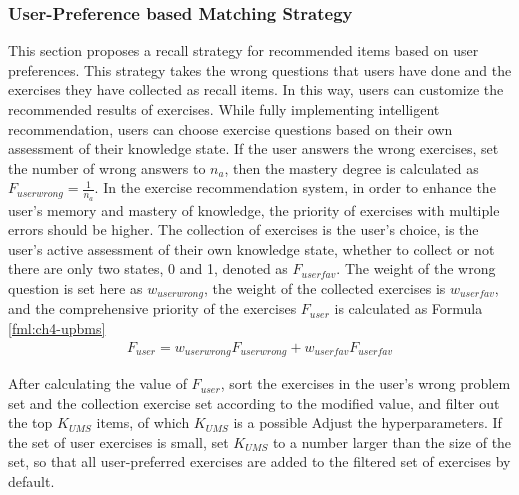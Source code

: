 \subsubsection{User-Preference based Matching Strategy}


This section proposes a recall strategy for recommended items based on user preferences. This strategy takes the wrong questions that users have done and the exercises they have collected as recall items. In this way, users can customize the recommended results of exercises. While fully implementing intelligent recommendation, users can choose exercise questions based on their own assessment of their knowledge state. If the user answers the wrong exercises, set the number of wrong answers to \(n_a\), then the mastery degree is calculated as \(F_{userwrong}=\frac{1}{n_a}\). In the exercise recommendation system, in order to enhance the user's memory and mastery of knowledge, the priority of exercises with multiple errors should be higher. The collection of exercises is the user's choice, is the user's active assessment of their own knowledge state, whether to collect or not there are only two states, 0 and 1, denoted as \(F_{userfav}\). The weight of the wrong question is set here as \(w_{userwrong}\), the weight of the collected exercises is \(w_{userfav}\), and the comprehensive priority of the exercises \(F_{user}\) is calculated as Formula \ref{fml:ch4-upbms}
\begin{align}
  F_{user} = w_{userwrong}F_{userwrong} + w_{userfav}F_{userfav} \label{fml:ch4-upbms}
\end{align}

After calculating the value of \(F_{user}\), sort the exercises in the user's wrong problem set and the collection exercise set according to the modified value, and filter out the top \(K_{UMS}\) items, of which \(K_{UMS}\) is a possible Adjust the hyperparameters. If the set of user exercises is small, set \(K_{UMS}\) to a number larger than the size of the set, so that all user-preferred exercises are added to the filtered set of exercises by default.

